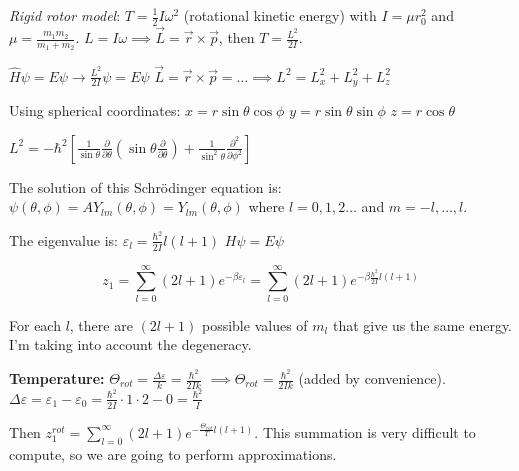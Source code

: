 \documentclass[12pt,a4paper]{report}
\newcommand{\esp}{\vspace{0.5cm}}
\begin{document}
	\esp
	
	\textit{Rigid rotor model}:
	$T = \frac{1}{2}I\omega^2$ (rotational kinetic energy) with $I = \mu r_0^2$ and $\mu = \frac{m_1 m_2}{m_1 + m_2}$.
	$L = I\omega \implies \vec{L} = \vec{r} \times \vec{p}$, then $T = \frac{L^2}{2I}$.
	
	\esp
	
	$\hat{H} \psi = E \psi \rightarrow \frac{L^2}{2I} \psi = E \psi$
	$\vec{L} = \vec{r} \times \vec{p} = \dots \implies L^2 = L_x^2 + L_y^2 + L_z^2$
	
	\esp
	
	Using spherical coordinates:
	$x = r \sin\theta \cos\phi$
	$y = r \sin\theta \sin\phi$
	$z = r \cos\theta$
	
	\esp
	
	$L^2 = -\hbar^2 \left[ \frac{1}{\sin\theta} \frac{\partial}{\partial\theta} (\sin\theta \frac{\partial}{\partial\theta}) + \frac{1}{\sin^2\theta} \frac{\partial^2}{\partial\phi^2} \right]$
	
	\esp
	
	The solution of this Schrödinger equation is:
	$\psi(\theta, \phi) = A Y_{lm}(\theta, \phi) = Y_{lm}(\theta, \phi)$
	where $l = 0, 1, 2 \dots$ and $m = -l, \dots, l$.
	
	\esp
	
	The eigenvalue is: $\varepsilon_l = \frac{\hbar^2}{2I} l(l+1)$ \quad $H \psi = E \psi$
	
	\esp
	
	\begin{equation}
		z_1 = \sum_{l=0}^{\infty} (2l+1) e^{-\beta \varepsilon_l} = \sum_{l=0}^{\infty} (2l+1) e^{-\beta \frac{\hbar^2}{2I} l(l+1)}
	\end{equation}
	
	For each $l$, there are $(2l+1)$ possible values of $m_l$ that give us the same energy. I'm taking into account the degeneracy.
	
	\esp
	
	\textbf{Temperature:}
	$\Theta_{rot} = \frac{\Delta \varepsilon}{k} = \frac{\hbar^2}{2Ik}$ \quad $\implies \Theta_{rot} = \frac{\hbar^2}{2Ik}$ (added by convenience).
	$\Delta \varepsilon = \varepsilon_1 - \varepsilon_0 = \frac{\hbar^2}{2I} \cdot 1 \cdot 2 - 0 = \frac{\hbar^2}{I}$
	
	\esp
	
	Then $z_1^{rot} = \sum_{l=0}^{\infty} (2l+1) e^{-\frac{\Theta_{rot}}{T} l(l+1)}$. This summation is very difficult to compute, so we are going to perform approximations.
	
\end{document}
